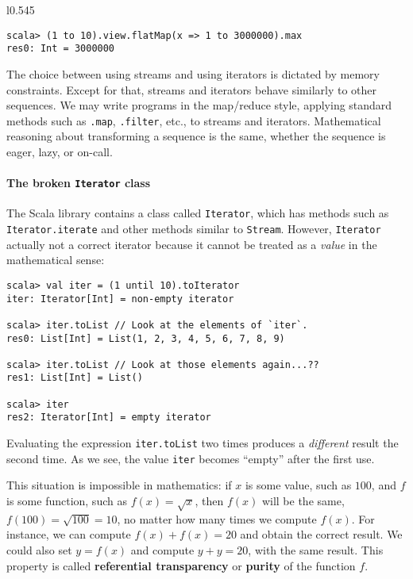 \begin{wrapfigure}{l}{0.545\columnwidth}%
\vspace{-0.75\baselineskip}
\begin{lstlisting}
scala> (1 to 10).view.flatMap(x => 1 to 3000000).max
res0: Int = 3000000
\end{lstlisting}
\vspace{-0.75\baselineskip}
\end{wrapfigure}%

\noindent The choice between using streams and using iterators is
dictated by memory constraints. Except for that, streams and iterators
behave similarly to other sequences. We may write programs in the
map/reduce style, applying standard methods such as \lstinline!.map!,
\lstinline!.filter!, etc., to streams and iterators. Mathematical
reasoning about transforming a sequence is the same, whether the sequence
is eager, lazy, or on-call.

\paragraph{The broken \texttt{Iterator} class}

The Scala library contains a class called \lstinline!Iterator!, which
has methods such as \lstinline!Iterator.iterate! and other methods
similar to \lstinline!Stream!. However, \lstinline!Iterator! actually
not a correct iterator because it cannot be treated as a \emph{value}
in the mathematical sense:
\begin{lstlisting}
scala> val iter = (1 until 10).toIterator
iter: Iterator[Int] = non-empty iterator

scala> iter.toList // Look at the elements of `iter`.
res0: List[Int] = List(1, 2, 3, 4, 5, 6, 7, 8, 9)

scala> iter.toList // Look at those elements again...??
res1: List[Int] = List()

scala> iter
res2: Iterator[Int] = empty iterator
\end{lstlisting}
Evaluating the expression \lstinline!iter.toList! two times produces
a \emph{different} result the second time. As we see, the value \lstinline!iter!
becomes ``empty'' after the first use.

This situation is impossible in mathematics: if $x$ is some value,
such as $100$, and $f$ is some function, such as $f(x)=\sqrt{x}$,
then $f(x)$ will be the same, $f(100)=\sqrt{100}=10$, no matter
how many times we compute $f(x)$. For instance, we can compute $f(x)+f(x)=20$
and obtain the correct result. We could also set $y=f(x)$ and compute
$y+y=20$, with the same result. This property is called \textbf{referential
transparency} or \textbf{purity} of the function
$f$.

